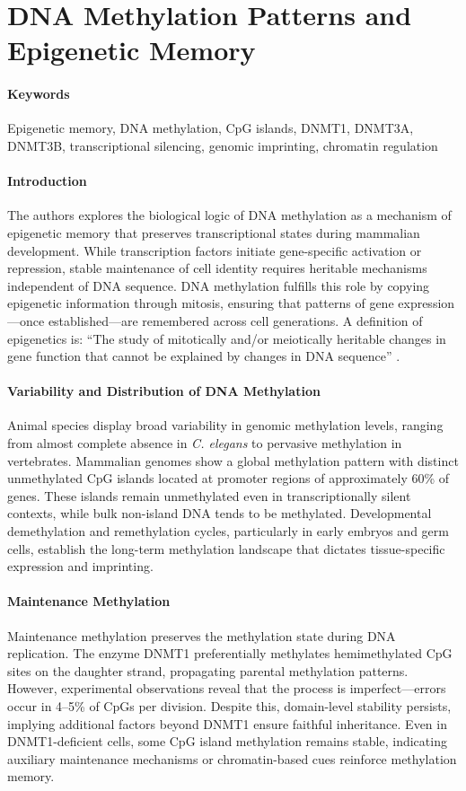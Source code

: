 \documentclass[10pt]{extarticle}
\begin{document}
\section{DNA Methylation Patterns and Epigenetic Memory}

\paragraph{Keywords}
Epigenetic memory, DNA methylation, CpG islands, DNMT1, DNMT3A, DNMT3B, transcriptional silencing, genomic imprinting, chromatin regulation \cite{bird2002dna}

\paragraph{Introduction}
The authors explores the biological logic of DNA methylation as a mechanism of epigenetic memory that preserves transcriptional states during mammalian development. While transcription factors initiate gene-specific activation or repression, stable maintenance of cell identity requires heritable mechanisms independent of DNA sequence. DNA methylation fulfills this role by copying epigenetic information through mitosis, ensuring that patterns of gene expression—once established—are remembered across cell generations. A definition of epigenetics
is: “The study of mitotically and/or meiotically
heritable changes in gene function that cannot be explained
by changes in DNA sequence” \cite{russo1996epigenetic}. 

\paragraph{Variability and Distribution of DNA Methylation}
Animal species display broad variability in genomic methylation levels, ranging from almost complete absence in \textit{C. elegans} to pervasive methylation in vertebrates. Mammalian genomes show a global methylation pattern with distinct unmethylated CpG islands located at promoter regions of approximately 60\% of genes. These islands remain unmethylated even in transcriptionally silent contexts, while bulk non-island DNA tends to be methylated. Developmental demethylation and remethylation cycles, particularly in early embryos and germ cells, establish the long-term methylation landscape that dictates tissue-specific expression and imprinting.

\paragraph{Maintenance Methylation}
Maintenance methylation preserves the methylation state during DNA replication. The enzyme DNMT1 preferentially methylates hemimethylated CpG sites on the daughter strand, propagating parental methylation patterns. However, experimental observations reveal that the process is imperfect—errors occur in 4–5\% of CpGs per division. Despite this, domain-level stability persists, implying additional factors beyond DNMT1 ensure faithful inheritance. Even in DNMT1-deficient cells, some CpG island methylation remains stable, indicating auxiliary maintenance mechanisms or chromatin-based cues reinforce methylation memory.
\end{document}
